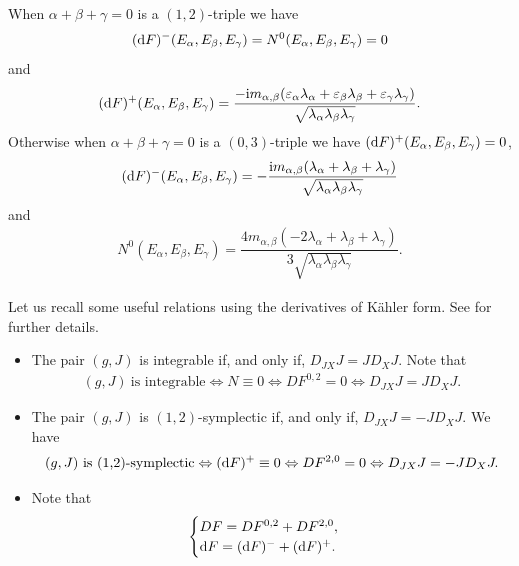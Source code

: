 \documentclass[10pt,a4paper]{amsart}
\numberwithin{equation}{section}
\begin{document}
\begin{Remark}
When $\alpha +\beta+\gamma=0$ is a $(1,2)$-triple we have
\begin{gather*}
({\rm d}F)^{-}(E_{\alpha},E_{\beta},E_{\gamma})=N^{0}(E_{\alpha},E_{\beta},E_{\gamma})=0
\end{gather*}
and
\begin{gather*}
({\rm d}F)^{+}(E_{\alpha},E_{\beta},E_{\gamma})=\dfrac{-{\rm i}m_{\alpha,\beta}(\varepsilon_{\alpha}\lambda_{\alpha}+\varepsilon_{\beta}\lambda_{\beta}+\varepsilon_{\gamma}\lambda_{\gamma})}{\sqrt{\lambda_{\alpha}\lambda_{\beta}\lambda_{\gamma}}}.
\end{gather*}
Otherwise when $\alpha +\beta+\gamma=0$ is a $(0,3)$-triple we have $({\rm d}F)^{+}(E_{\alpha},E_{\beta},E_{\gamma})=0$,
\begin{gather*}
({\rm d}F)^{-}(E_{\alpha},E_{\beta},E_{\gamma})
=-\dfrac{{\rm i}m_{\alpha,\beta}(\lambda_{\alpha}+\lambda_{\beta}+\lambda_{\gamma})}{\sqrt{\lambda_{\alpha}\lambda_{\beta}\lambda_{\gamma}}}
\end{gather*}
and
\begin{gather*}
N^{0}(E_{\alpha},E_{\beta},E_{\gamma})=\dfrac{4m_{\alpha,\beta}(-2\lambda_{\alpha}+\lambda_{\beta}+\lambda_{\gamma})}{3 \sqrt{\lambda_{\alpha}\lambda_{\beta}\lambda_{\gamma}}}.
\end{gather*}
\end{Remark}

\begin{Remark}Let us recall some useful relations using the derivatives of K\"ahler form. See \cite{gau} for further details.
\begin{itemize}\itemsep=0pt
\item The pair $(g,J)$ is integrable if, and only if, $D_{JX}J=JD_{X}J$.
Note that
\begin{gather*}
(g,J) \ \text{is integrable} \Leftrightarrow N\equiv 0 \Leftrightarrow DF^{0,2}=0\Leftrightarrow D_{JX}J=JD_{X}J.
\end{gather*}

\item The pair $(g,J)$ is $(1,2)$-symplectic if, and only if, $D_{JX}J=-JD_{X}J$.
We have
\begin{gather*}
(g,J) \ \text{is} \ \text{(1,2)-symplectic} \Leftrightarrow ({\rm d}F)^{+}\equiv 0 \Leftrightarrow DF^{2,0}=0\Leftrightarrow D_{JX}J=-JD_{X}J.
\end{gather*}

\item Note that
\begin{gather*}
\begin{cases}
DF=DF^{0,2}+DF^{2,0},
\\
{\rm d}F=({\rm d}F)^{-}+({\rm d}F)^{+}.
\end{cases}
\end{gather*}
\end{itemize}
\end{Remark}
\end{document}
